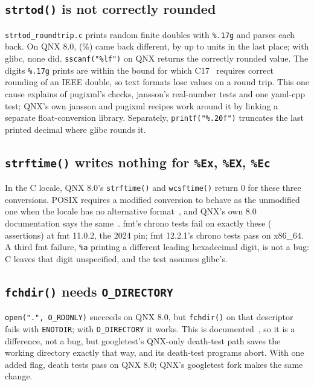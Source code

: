 \documentclass[conference]{IEEEtran}
\begin{document}
\subsection{\texttt{strtod()} is not correctly rounded}\label{sec:findings-strtod}
\texttt{strtod\_roundtrip.c} prints  random finite doubles with \texttt{\%.17g} and parses each back.
On QNX 8.0,  (\%) came back different, by up to  units in the last
place; with glibc, none did. \texttt{sscanf("\%lf")} on QNX returns the correctly rounded value. The digits
\texttt{\%.17g} prints are within the bound for which C17~\cite{isoc17} requires correct rounding of an IEEE double,
so text formats lose values on a round trip. This one cause explains  of pugixml's
 checks, jansson's real-number tests and one yaml-cpp test; QNX's own jansson and pugixml
recipes work around it by linking a separate float-conversion library. Separately, \texttt{printf("\%.20f")}
truncates the last printed decimal where glibc rounds it.

\subsection{\texttt{strftime()} writes nothing for \texttt{\%Ex}, \texttt{\%EX}, \texttt{\%Ec}}\label{sec:findings-strftime}
In the C locale, QNX 8.0's \texttt{strftime()} and \texttt{wcsftime()} return 0 for these three conversions.
POSIX requires a modified conversion to behave as the unmodified one when the locale has no alternative
format~\cite{posixstrftime}, and QNX's own 8.0 documentation says the same~\cite{qnxstrftime}. fmt's chrono tests
fail on exactly these ( assertions) at fmt 11.0.2, the 2024 pin; fmt 12.2.1's chrono tests
pass on x86\_64. A third fmt failure, \texttt{\%a} printing a
different leading hexadecimal digit, is not a bug: C leaves that digit unspecified, and the test assumes glibc's.

\subsection{\texttt{fchdir()} needs \texttt{O\_DIRECTORY}}\label{sec:findings-fchdir}
\texttt{open(".", O\_RDONLY)} succeeds on QNX 8.0, but \texttt{fchdir()} on that descriptor fails with
\texttt{ENOTDIR}; with \texttt{O\_DIRECTORY} it works. This is documented~\cite{qnxfchdir}, so it is a difference,
not a bug, but googletest's QNX-only death-test path saves the working directory exactly that way, and its
death-test programs abort. With one added flag,  death tests pass on QNX 8.0; QNX's googletest fork
makes the same change.
\end{document}
